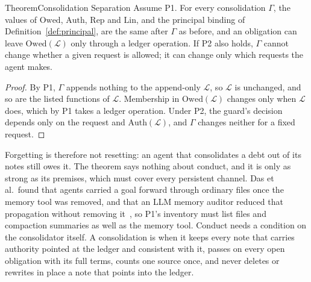 \begin{pdclaim}{Theorem}{Consolidation Separation}
\label{thm:stp-consolidation-separation}
Assume P1. For every consolidation $\Gamma$, the values of $\mathrm{Owed}$,
$\mathrm{Auth}$, $\mathrm{Rep}$ and $\mathrm{Lin}$, and the principal binding of
Definition~\ref{def:principal}, are the same after $\Gamma$ as before, and an
obligation can leave $\mathrm{Owed}(\mathcal{L})$ only through a ledger operation. If P2
also holds, $\Gamma$ cannot change whether a given request is allowed; it can
change only which requests the agent makes.
\end{pdclaim}
\begin{proof}
By P1, $\Gamma$ appends nothing to the append-only $\mathcal{L}$, so $\mathcal{L}$ is unchanged, and
so are the listed functions of $\mathcal{L}$. Membership in $\mathrm{Owed}(\mathcal{L})$ changes
only when $\mathcal{L}$ does, which by P1 takes a ledger operation. Under P2, the guard's
decision depends only on the request and $\mathrm{Auth}(\mathcal{L})$, and $\Gamma$
changes neither for a fixed request.
\end{proof}

Forgetting is therefore not resetting: an agent that consolidates a debt out of
its notes still owes it. The theorem says nothing about conduct, and it is only
as strong as its premises, which must cover every persistent channel. Das et
al.\ found that agents carried a goal forward through ordinary files once the
memory tool was removed, and that an LLM memory auditor reduced that
propagation without removing it~, so P1's
inventory must list files and compaction summaries as well as the memory tool.
Conduct needs a condition on the consolidator itself. A consolidation is
 when it keeps every note that carries authority
pointed at the ledger and consistent with it, passes on every open obligation
with its full terms, counts one source once, and never deletes or rewrites in
place a note that points into the ledger.

